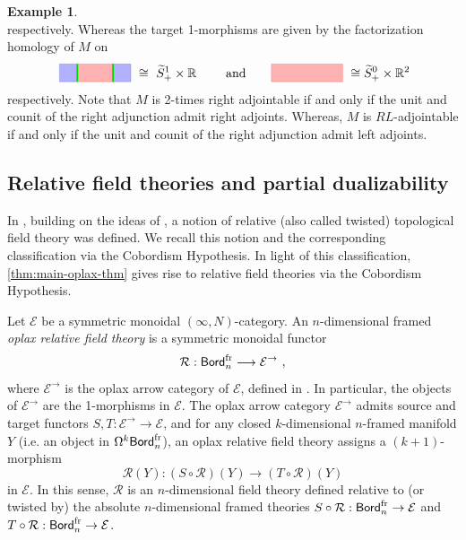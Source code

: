 \documentclass[10pt, reqno, twoside
, final
]{amsart}
\numberwithin{equation}{subsection}%
\theoremstyle{definition}
\theoremstyle{definition}
\theoremstyle{definition}
\theoremstyle{definition}
\theoremstyle{definition}
\theoremstyle{definition}
\theoremstyle{definition}
\theoremstyle{definition}
\theoremstyle{definition}
\theoremstyle{plain}
\theoremstyle{definition}
\theoremstyle{plain}
\theoremstyle{definition}
\theoremstyle{plain}
\theoremstyle{definition}
\theoremstyle{definition}
\theoremstyle{plain}
\theoremstyle{plain}
\theoremstyle{definition}
\newtheorem{ex}[defn]{Example}
\theoremstyle{plain}
\theoremstyle{plain}
\theoremstyle{plain}
\begin{document}
\begin{ex}
\begin{equation*}
\end{equation*}
respectively. Whereas the target 1-morphisms are given by the factorization homology of $M$ on 
\begin{equation*}
    \  \begin{tikzpicture}[baseline=0.13cm]
\filldraw[blue,opacity=0.3] (0,0) rectangle (0.5,0.5);
\filldraw[blue,opacity=0.3] (1.5,0) rectangle (2,0.5);
\filldraw[red,opacity=0.3] (0.5,0) rectangle (1.5,0.5);
\draw[very thick, green!85!black] (0.5,0) -- (0.5,0.5);
\draw[very thick, green!85!black](1.5,0) -- (1.5,0.5);
\end{tikzpicture} \ \cong\  \widetilde{S}^1_{+} \times \R \qquad \ \text{and} \qquad  
\begin{tikzpicture}[baseline=0.13cm]
\filldraw[red,opacity=0.3] (0,0) rectangle (2,0.5);
\end{tikzpicture}\  \cong \widetilde{S}^0_{+} \times \R^2
\end{equation*}
respectively. Note that $M$ is 2-times right adjointable if and only if the unit and counit of the right adjunction admit right adjoints. Whereas, $M$ is $RL$-adjointable if and only if the unit and counit of the right adjunction admit left adjoints.
\end{ex}



\subsection{Relative field theories and partial dualizability}

In \cite{JFS}, building on the ideas of \cite{ST,FTrel}, a notion of relative (also called twisted) topological field theory was defined. We recall this notion and the corresponding classification via the Cobordism Hypothesis. In light of this classification, \cref{thm:main-oplax-thm} gives rise to relative field theories via the Cobordism Hypothesis.

Let $\mathcal{E}$ be a symmetric monoidal $(\infty,N)$-category. An $n$-dimensional framed \emph{oplax relative field theory} is a symmetric monoidal functor
\begin{align*}
    \mathcal{R} : \mathsf{Bord}_{n}^{\text{fr}} \longrightarrow \mathcal{E}^\to \ ,
\end{align*}
where $\mathcal{E}^\to$ is the oplax arrow category of $\mathcal{E}$, defined in \cite{JFS}. In particular, the objects of $\mathcal{E}^\to$ are the 1-morphisms in $\mathcal{E}$. The oplax arrow category $\mathcal{E}^{\to}$ admits source and target functors $S,T\colon \mathcal{E}^\to \to \mathcal{E}$, and for any closed $k$-dimensional $n$-framed manifold $Y$  (i.e. an object in $\Omega^{k}\mathsf{Bord}_n^{\text{fr}}$), an oplax relative field theory assigns a $(k+1)$-morphism
\begin{equation*}
    \mathcal{R}(Y) \colon (S\circ \mathcal{R})(Y) \longrightarrow (T\circ \mathcal{R})(Y)
\end{equation*}
in $\mathcal{E}$. In this sense, $\mathcal{R}$ is an $n$-dimensional field theory defined relative to (or twisted by) the absolute $n$-dimensional framed theories $S\circ \mathcal{R} :\mathsf{Bord}_{n}^{\text{fr}} \to \mathcal{E}$ and $T\circ \mathcal{R} :\mathsf{Bord}_{n}^{\text{fr}} \to \mathcal{E}$.
\end{document}
